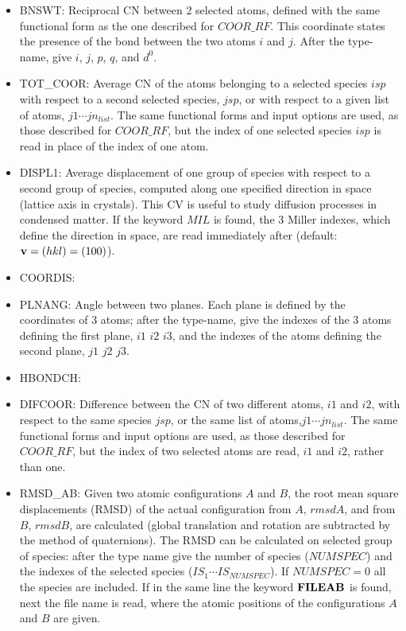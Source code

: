 \documentclass[twoside,10pt,titlepage,a4paper]{article}
\begin{document}
\begin{itemize}
\item{BNSWT:} Reciprocal CN between 2 selected atoms, defined with the same
functional form as the one described for $COOR\_RF$.
This coordinate states the presence of the bond between the two atoms $i$ and $j$.
After the type-name, give $i$, $j$, $p$, $q$, and $d^0$.
\item{TOT\_COOR:} Average CN of the atoms belonging to a selected species $isp$
with respect to a second selected species, $jsp$, or with respect to a given
list of atoms, $j1 \cdots jn_{list}$.
The same functional forms and input options are used, as those
described for $COOR\_RF$, but the index of one selected species $isp$
is read in place of the index of one atom.
\item{DISPL1:} Average displacement of one group of species with respect
to a second group of species, computed along one specified direction in
space (lattice axis in crystals).
This  CV is useful to study diffusion processes in condensed matter.
If the keyword $MIL$ is found, the 3 Miller indexes, which define the direction
in space, are read immediately after (default: ${\bf v}=(hkl)=(100)$).
\item{COORDIS:}
\item{PLNANG:} Angle between two planes. Each plane is defined by the
coordinates of 3 atoms; after the type-name, give the indexes of the
3 atoms defining the first plane, $i1$ $i2$ $i3$, and the indexes
of the atoms defining the second plane,  $j1$ $j2$ $j3$.
\item{HBONDCH:}
\item{DIFCOOR:} Difference between the CN of two different atoms,
$i1$ and $i2$, with respect to the same species $jsp$, or the same list of
atoms,$j1 \cdots jn_{list}$.
The same functional forms and input options are used, as those described for
$COOR\_RF$, but the index of two selected atoms are read, $i1$ and $i2$,  rather than one.
\item{RMSD\_AB:} Given two atomic configurations $A$ and $B$, the root mean square
displacements (RMSD) of the actual configuration from $A$, $rmsdA$, and from $B$,
$rmsdB$, are calculated (global translation and rotation are subtracted by
the method of quaternions). The RMSD can be calculated on selected group of species:
after the type name give the number of species ($NUMSPEC$) and the indexes
of the selected species ($IS_{1} \cdots IS_{NUMSPEC}$).
If $NUMSPEC = 0$ all the species are included.
If in the same line the keyword ${\bf FILEAB}$ is found, next the file name
is read, where the atomic positions of the configurations $A$ and $B$ are given.

\end{itemize}
\end{document}
